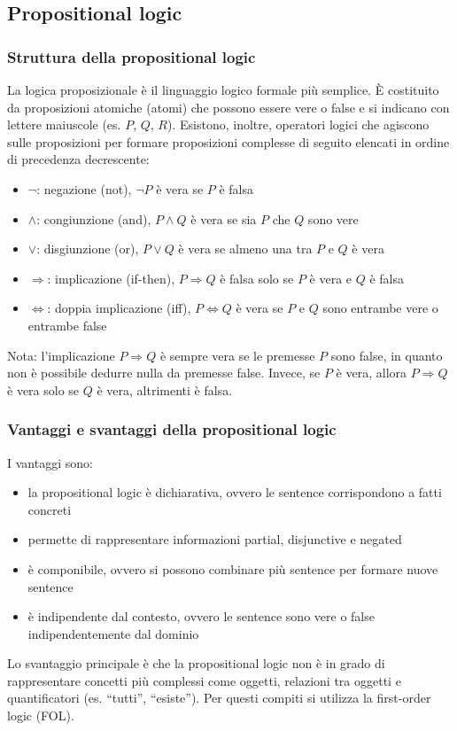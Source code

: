 \vspace{15pt}

\subsection{Propositional logic}
\subsubsection*{Struttura della propositional logic}
La logica proposizionale è il linguaggio logico formale più semplice. È costituito da proposizioni atomiche (atomi) che possono
essere vere o false e si indicano con lettere maiuscole (es. \(P\), \(Q\), \(R\)). Esistono, inoltre, operatori logici che
agiscono sulle proposizioni per formare proposizioni complesse di seguito elencati in ordine di precedenza decrescente:
\begin{itemize}
	\item \(\neg\): negazione (not), \(\neg P\) è vera se \(P\) è falsa
	\item \(\land\): congiunzione (and), \(P \land Q\) è vera se sia \(P\) che \(Q\) sono vere
	\item \(\lor\): disgiunzione (or), \(P \lor Q\) è vera se almeno una tra \(P\) e \(Q\) è vera
	\item \(\Rightarrow\): implicazione (if-then), \(P \Rightarrow Q\) è falsa solo se \(P\) è vera e \(Q\) è falsa
	\item \(\Leftrightarrow\): doppia implicazione (iff), \(P \Leftrightarrow Q\) è vera se \(P\) e \(Q\) sono entrambe vere o entrambe false
\end{itemize}
Nota: l'implicazione \(P \Rightarrow Q\) è sempre vera se le premesse \(P\) sono false, in quanto non è possibile dedurre nulla
da premesse false. Invece, se \(P\) è vera, allora \(P \Rightarrow Q\) è vera solo se \(Q\) è vera, altrimenti è falsa.

\subsubsection*{Vantaggi e svantaggi della propositional logic}
I vantaggi sono:
\begin{itemize}
	\item la propositional logic è dichiarativa, ovvero le sentence corrispondono a fatti concreti
	\item permette di rappresentare informazioni partial, disjunctive e negated
	\item è componibile, ovvero si possono combinare più sentence per formare nuove sentence
	\item è indipendente dal contesto, ovvero le sentence sono vere o false indipendentemente dal dominio
\end{itemize}
Lo svantaggio principale è che la propositional logic non è in grado di rappresentare concetti più complessi come
oggetti, relazioni tra oggetti e quantificatori (es. ``tutti'', ``esiste''). Per questi compiti si utilizza la
first-order logic (FOL).

